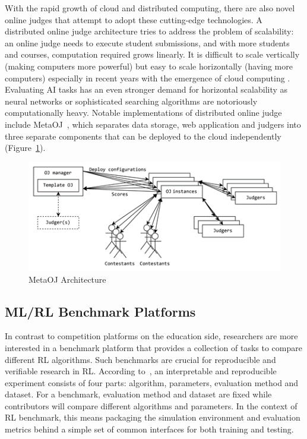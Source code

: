 With the rapid growth of cloud and distributed computing, there are also novel online judges that attempt to adopt these cutting-edge technologies. A distributed online judge architecture tries to address the problem of scalability: an online judge needs to execute student submissions, and with more students and courses, computation required grows linearly. It is difficult to scale vertically (making computers more powerful) but easy to scale horizontally (having more computers) especially in recent years with the emergence of cloud computing \parencite{RN17}. Evaluating AI tasks has an even stronger demand for horizontal scalability as neural networks or sophisticated searching algorithms are notoriously computationally heavy. Notable implementations of distributed online judge include MetaOJ~\parencite{metaoj}, which separates data storage, web application and judgers into three separate components that can be deployed to the cloud independently (Figure~\ref{fig:metaoj}).

\begin{figure}[H]
    \centering
    \includegraphics{images/metaoj.png}
    \caption{MetaOJ Architecture \parencite{metaoj}}
    \label{fig:metaoj}
\end{figure}

\subsection{ML/RL Benchmark Platforms}
\label{ss:intro-rl-benchmark-platforms}
In contrast to competition platforms on the education side, researchers are more interested in a benchmark platform that provides a collection of tasks to compare different RL algorithms. Such benchmarks are crucial for reproducible and verifiable research in RL. According to~\textcite{RN20}, an interpretable and reproducible experiment consists of four parts: algorithm, parameters, evaluation method and dataset. For a benchmark, evaluation method and dataset are fixed while contributors will compare different algorithms and parameters. In the context of RL benchmark, this means packaging the simulation environment and evaluation metrics behind a simple set of common interfaces for both training and testing.

